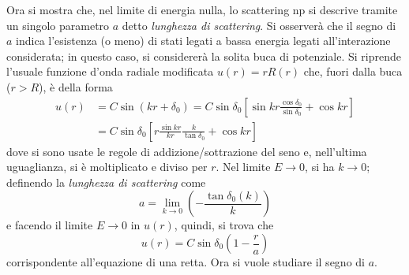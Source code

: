 \documentclass[11pt, a4paper]{scrartcl}
\theoremstyle{style}
\numberwithin{equation}{subsection}
\begin{document}
Ora si mostra che, nel limite di energia nulla, lo scattering np si descrive tramite un singolo parametro $a$ detto \textit{lunghezza di scattering}.
Si osserver\`a che il segno di $a$ indica l'esistenza (o meno) di stati legati a bassa energia legati all'interazione considerata; in questo caso, si considerer\`a la solita buca di potenziale.
Si riprende l'usuale funzione d'onda radiale modificata $u(r) = r R(r)$ che, fuori dalla buca ($r>R$), \`e della forma
\[
	\begin{split}
		u(r) &= C \sin (kr + \delta _0) = C \sin \delta _0 \left[ \sin kr \frac{\cos \delta _0}{\sin \delta _0} + \cos kr \right]  \\
		     &= C \sin \delta _0 \left[ r \frac{\sin kr}{kr} \frac{k}{\tan \delta _0} + \cos kr \right] 
	\end{split}
\] 
dove si sono usate le regole di addizione/sottrazione del seno e, nell'ultima uguaglianza, si \`e moltiplicato e diviso per $r$.
Nel limite $E\to 0$, si ha $k\to 0$; definendo la \textit{lunghezza di scattering} come
\begin{equation}
	a = \lim_{k \to 0} \left(- \frac{\tan \delta _0(k)}{k}\right) 
\end{equation}
e facendo il limite $E\to 0$ in $u(r)$, quindi, si trova che
\[
u(r)  = C \sin \delta _0 \left(1-\frac{r}{a}\right) 
\] 
corrispondente all'equazione di una retta.
Ora si vuole studiare il segno di $a$.
\end{document}
